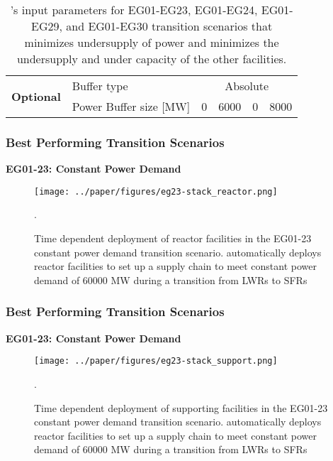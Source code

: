 \begin{frame}
\begin{table}[]
{\begin{tabular}{|l|l|c|l|l|l|}
        \multirow{2}{*}{\textbf{Optional}} & Buffer type                                                    & \multicolumn{4}{c|}{Absolute}                                                                                                                                                                                                                                                               \\ \cline{2-6} 
                                                  & Power Buffer size [MW]                                                   & 0 & 6000 & 0 & 8000 \\ \hline
        \end{tabular}%
        }
        \caption{\deploy's input parameters for EG01-EG23, EG01-EG24, EG01-EG29, and 
        EG01-EG30 transition scenarios
        that minimizes undersupply of power and minimizes 
        the undersupply and under capacity of the other facilities. }
        \label{tab:bestinputs}
        \end{table}
\end{frame}

\begin{frame}
    \frametitle{Best Performing Transition Scenarios}
    \textbf{EG01-23: Constant Power Demand}
    \begin{figure}[htbp!]
        \begin{center}
          \texttt{[image: ../paper/figures/eg23-stack\_reactor.png]}
        \end{center}
              \caption{Time dependent deployment of reactor facilities in 
              the EG01-23 constant power demand transition scenario. 
              \deploy automatically deploys reactor facilities 
              to set up a supply chain to meet constant power demand of $60000$ MW
              during a transition from \glspl{LWR} to \glspl{SFR}}.
      \end{figure}
\end{frame}

\begin{frame}
    \frametitle{Best Performing Transition Scenarios}
    \textbf{EG01-23: Constant Power Demand}
    \begin{figure}[htbp!]
        \begin{center}
          \texttt{[image: ../paper/figures/eg23-stack\_support.png]}
        \end{center}
              \caption{Time dependent deployment of supporting facilities in 
              the EG01-23 constant power demand transition scenario. 
              \deploy automatically deploys reactor facilities 
              to set up a supply chain to meet constant power demand of $60000$ MW
              during a transition from \glspl{LWR} to \glspl{SFR}}.
      \end{figure}
\end{frame}

